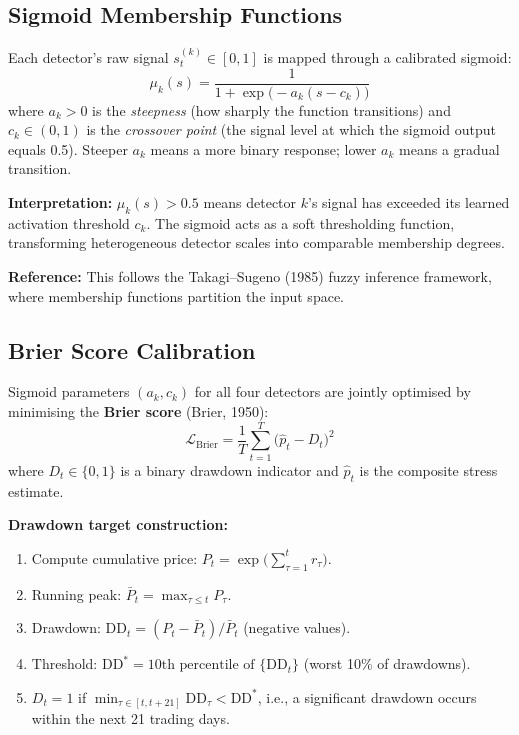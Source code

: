 \documentclass[11pt,a4paper]{article}
\begin{document}
\subsection{Sigmoid Membership Functions}

Each detector's raw signal $s_t^{(k)} \in [0,1]$ is mapped through a calibrated sigmoid:
\begin{equation}
  \mu_k(s) = \frac{1}{1 + \exp\!\big(-a_k(s - c_k)\big)} \label{eq:sigmoid}
\end{equation}
where $a_k > 0$ is the \emph{steepness} (how sharply the function transitions) and $c_k \in (0,1)$ is the \emph{crossover point} (the signal level at which the sigmoid output equals 0.5). Steeper $a_k$ means a more binary response; lower $a_k$ means a gradual transition.

\textbf{Interpretation:} $\mu_k(s) > 0.5$ means detector $k$'s signal has exceeded its learned activation threshold $c_k$. The sigmoid acts as a soft thresholding function, transforming heterogeneous detector scales into comparable membership degrees.

\textbf{Reference:} This follows the Takagi--Sugeno (1985) fuzzy inference framework, where membership functions partition the input space.

\subsection{Brier Score Calibration}

Sigmoid parameters $(a_k, c_k)$ for all four detectors are jointly optimised by minimising the \textbf{Brier score} (Brier, 1950):
\begin{equation}
  \mathcal{L}_{\mathrm{Brier}} = \frac{1}{T}\sum_{t=1}^{T}\big(\hat{p}_t - D_t\big)^2 \label{eq:brier}
\end{equation}
where $D_t \in \{0, 1\}$ is a binary drawdown indicator and $\hat{p}_t$ is the composite stress estimate.

\textbf{Drawdown target construction:}
\begin{enumerate}[nosep]
  \item Compute cumulative price: $P_t = \exp\!\big(\sum_{\tau=1}^{t} r_\tau\big)$.
  \item Running peak: $\bar{P}_t = \max_{\tau \le t} P_\tau$.
  \item Drawdown: $\mathrm{DD}_t = (P_t - \bar{P}_t) / \bar{P}_t$ (negative values).
  \item Threshold: $\mathrm{DD}^* = \text{10th percentile of } \{\mathrm{DD}_t\}$ (worst 10\% of drawdowns).
  \item $D_t = 1$ if $\min_{\tau \in [t, t+21]} \mathrm{DD}_\tau < \mathrm{DD}^*$, i.e., a significant drawdown occurs within the next 21 trading days.
\end{enumerate}
\end{document}
